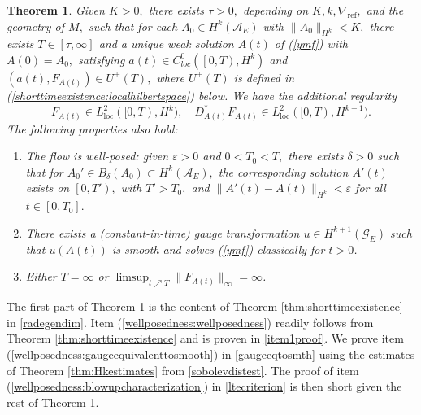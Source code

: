 \documentclass[12pt]{amsart}
\newcommand{\LB}{\left[}
\newcommand{\RB}{\right]}
\renewcommand{\1}{{\mathbf 1}}
\newcommand{\eps}{{\varepsilon}}
\newtheorem{thm}{Theorem}[section]
\theoremstyle{others}
\numberwithin{equation}{section}
\begin{document}
 \begin{thm}\label{thm:wellposedness}
     Given $K > 0,$ there exists $\tau> 0,$ depending on $K, k, \nabla_{\text{ref}},$ and the geometry of $M,$ such that for each $A_0 \in H^k\left( \mathcal{A}_E \right)$ with $\|A_0 \|_{H^k} < K,$ there exists $T \in [\tau,  \infty]$ and a unique weak solution $A(t)$ of (\ref{ymf}) with $A(0) = A_0,$ satisfying $a(t) \in C^0_{loc}(\left[0, T \right), H^k)$ and $\left( a(t), F_{A(t)} \right) \in U^+(T),$ where \(U^+(T)\) is defined in (\ref{shorttimeexistence:localhilbertspace}) below. We have the additional regularity
     \begin{equation}
        F_{A(t)} \in L_{\text{loc}}^2([0, T), H^k), \quad D_{A(t)}^\ast F_{A(t)} \in L_{\text{loc}}^2([0, T), H^{k-1}).
        \end{equation}
        The following properties also hold:
     \begin{enumerate}
         \item \label{wellposedness:wellposedness} The flow is well-posed: given $\eps > 0$ and $0 < T_0 < T,$ there exists $\delta > 0$ such that for $A_0' \in B_{\delta}(A_0) \subset H^k \left( \mathcal{A}_E \right),$ the corresponding solution $A'(t)$ exists on $\LB 0, T' \right),$ with $T' > T_0,$ and $\| A'(t) - A(t) \|_{H^k} < \eps$ for all $t \in \LB 0 , T_0 \RB.$
         \item \label{wellposedness:gaugeequivalenttosmooth} There exists a (constant-in-time) gauge transformation \(u \in H^{k+1}(\mathcal{G}_E)\) such that \(u(A(t))\) is smooth and solves (\ref{ymf}) classically for \(t > 0\).
         \item \label{wellposedness:blowupcharacterization} Either $T = \infty$ or \(\limsup_{t \nearrow T} \|F_{A(t)}\|_\infty = \infty\).
     \end{enumerate}
 \end{thm}
The first part of Theorem \ref{thm:wellposedness} is the content of Theorem \ref{thm:shorttimeexistence} in \textsection \ref{radegendim}. Item (\ref{wellposedness:wellposedness}) readily follows from Theorem \ref{thm:shorttimeexistence} and is proven in \textsection \ref{item1proof}. We prove item (\ref{wellposedness:gaugeequivalenttosmooth}) in \textsection \ref{gaugeeqtosmth} using the estimates of Theorem \ref{thm:Hkestimates} from \textsection \ref{sobolevdistest}. The proof of item (\ref{wellposedness:blowupcharacterization}) in \textsection \ref{ltecriterion} is then short given the rest of Theorem \ref{thm:wellposedness}.
\end{document}
